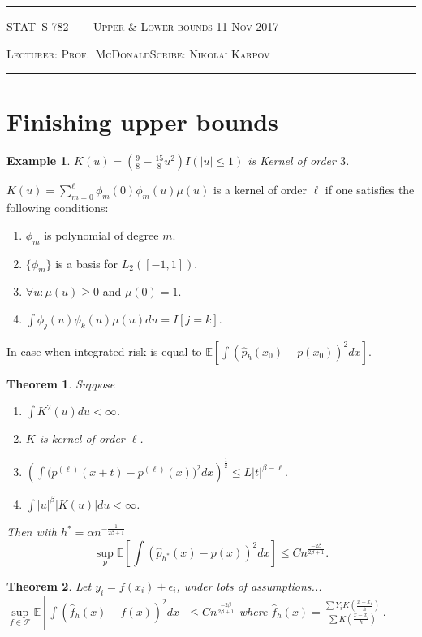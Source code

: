 \documentclass[10pt]{article}
\newcounter{lecnum}
\newtheorem{theorem}{Theorem}[lecnum]
\newtheorem{example}[ex]{Example}
\newcommand{\Expect}[1]{\mathbb{E}\!\left[#1\right]}
\renewcommand{\hat}{\widehat}
\newcommand{\lecturer}{Prof.\ McDonald}
\newcommand{\scribe}{Nikolai Karpov}
\newcommand{\chtitle}{Upper \& Lower bounds}
\newcommand{\lecdate}{11 Nov 2017}
\begin{document}
\rule{6.5in}{1pt}

\textsc{STAT--S 782
        \hfill \thelecnum\ --- \chtitle
        \hfill \lecdate}

\textsc{Lecturer: \lecturer \hfill Scribe: \scribe}
\rule{6.5in}{1pt}

\section{Finishing upper bounds}
\begin{example}
	$K(u)=\left(\frac{9}{8}-\frac{15}{8}u^2\right)I(|u|\leq 1)$ is Kernel of order $3$.
\end{example}
$K(u)=\sum\limits_{m=0}^{\ell}\phi_m(0)\phi_m(u)\mu(u)$ is a kernel of order $\ell$ if one satisfies the following conditions:
\begin{enumerate}
	\item $\phi_m$ is polynomial of degree $m$.
	\item $\{\phi_m\}$ is a basis for $L_2\left([-1, 1]\right)$.
	\item $\forall{u}:\mu(u)\geq 0$ and $\mu(0)=1$.
	\item $\int{\phi_j(u)\phi_k(u)\mu(u){du}}=I[j=k].$
\end{enumerate}

In case when integrated risk is equal to $\Expect{\int{(\hat{p}_h(x_0)-p(x_0))^2dx}}$.
\begin{theorem}
	Suppose
	\begin{enumerate}
		\item $\int{K^2(u)du} < \infty$.
		\item $K$ is kernel of order $\ell$.
		\item $\left(\int{(p^{(\ell)}}(x+t)-p^{(\ell)}(x))^2dx\right)^\frac{1}{2} \leq L |t|^{\beta-\ell}.$
		\item $\int{|u|^{\beta}|K(u)|du}<\infty$.
	\end{enumerate}
	Then with $h^*=\alpha n ^{-\frac{1}{2\beta+1}}$
	$$\sup\limits_{p} \Expect{\int{(\hat{p}_{h^*}(x)-p(x))^2}dx} \leq C{n^{\frac{-2\beta}{2\beta+1}}}.$$
\end{theorem}

\begin{theorem}
	Let $y_i=f(x_i)+\epsilon_i$, under lots of assumptions...
	$\sup\limits_{f \in \mathcal{F}}\Expect{\int{(\hat{f}_h(x)-f(x))^2{dx}}} \leq Cn^{\frac{-2\beta}{2\beta+1}}$ where $\hat{f}_h(x)=\frac{\sum{Y_i{K\left(\frac{x-x_i}{h}\right)}}}{\sum{K\left(\frac{x-x_i}{h}\right)}}\,.$
\end{theorem}
\end{document}
